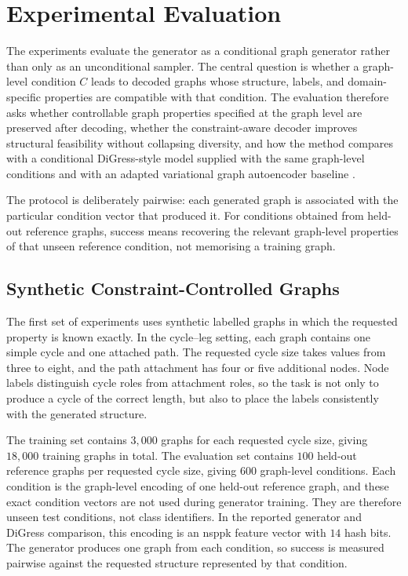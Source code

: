\section{Experimental Evaluation}
\label{sec:generator:experiments}

The experiments evaluate the generator as a conditional graph generator rather
than only as an unconditional sampler. The central question is whether a
graph-level condition \(C\) leads to decoded graphs whose structure, labels, and
domain-specific properties are compatible with that condition. The evaluation
therefore asks whether controllable graph properties specified at the graph
level are preserved after decoding, whether the constraint-aware decoder improves
structural feasibility without collapsing diversity, and how the method compares
with a conditional DiGress-style model \citep{vignac2022digress} supplied with
the same graph-level conditions and with an adapted variational graph
autoencoder baseline \citep{kipf2016vgae,simonovsky2018graphvae}.

The protocol is deliberately pairwise: each generated graph is associated with
the particular condition vector that produced it. For conditions obtained from
held-out reference graphs, success means recovering the relevant graph-level
properties of that unseen reference condition, not memorising a training graph.

\subsection{Synthetic Constraint-Controlled Graphs}

The first set of experiments uses synthetic labelled graphs in which the
requested property is known exactly. In the cycle--leg setting, each graph
contains one simple cycle and one attached path. The requested cycle size takes
values from three to eight, and the path attachment has four or five additional
nodes. Node labels distinguish cycle roles from attachment roles, so the task is
not only to produce a cycle of the correct length, but also to place the labels
consistently with the generated structure.

The training set contains \(3{,}000\) graphs for each requested cycle size, giving
\(18{,}000\) training graphs in total. The evaluation set contains \(100\)
held-out reference graphs per requested cycle size, giving \(600\) graph-level
conditions. Each condition is the graph-level encoding of one held-out reference
graph, and these exact condition vectors are not used during generator training.
They are therefore unseen test conditions, not class identifiers. In the reported
generator and DiGress comparison, this encoding is an \gls{nsppk} feature vector
with \(14\) hash bits. The generator produces one graph from each condition, so
success is measured pairwise against the requested structure represented by that
condition.

